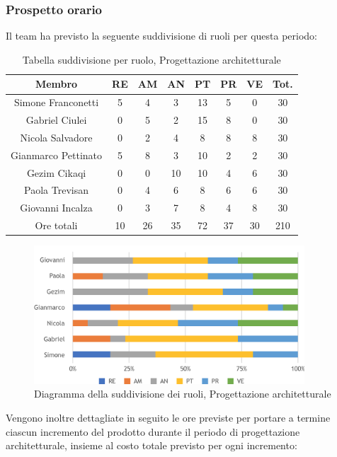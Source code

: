 \subsubsection{Prospetto orario}
Il team ha previsto la seguente suddivisione di ruoli per questa periodo:
\\
\begin{table}[h]
\caption{Tabella suddivisione per ruolo, Progettazione architetturale}
\begin{center}
\begin{tabular}{ |c|c|c|c|c|c|c|c|  }
 \hline
 Membro 		& RE 	& AM 	& AN 	& PT 	& PR 	& VE 	& Tot.\\
 \hline\hline
 Simone	Franconetti		& 5 		& 4		& 3 	& 13 	& 5 		& 0 		& 30\\
 Gabriel Ciulei		& 0 		& 5 		& 2 	& 15		& 8 		& 0 		& 30\\
 Nicola	Salvadore		& 0 		& 2 		& 4 	& 8		& 8 		& 8 		& 30\\
 Gianmarco	Pettinato	& 5 		& 8 		& 3 	& 10 	& 2 		& 2 		& 30\\
 Gezim	Cikaqi		& 0 		& 0 		& 10 	& 10		& 4 		& 6	 	& 30\\
 Paola	Trevisan		& 0 		& 4 		& 6 	& 8 		& 6 		& 6 		& 30\\
 Giovanni Incalza		& 0 		& 3	 	& 7 	& 8		& 4 		& 8  	& 30\\
 \hline\hline
 Ore totali		& 10		& 26		& 35 	& 72	 	& 37 	& 30 	& 210\\
  \hline
\end{tabular}
\end{center}
\end{table}
\begin{figure}[h!]
	\includegraphics[width=0.9\textwidth]{res/img/hi336}
	\caption{Diagramma della suddivisione dei ruoli, Progettazione architetturale}
\end{figure}

\noindent Vengono inoltre dettagliate in seguito le ore previste per portare a termine ciascun incremento del prodotto durante il periodo di progettazione architetturale, insieme al costo totale previsto per ogni incremento:


